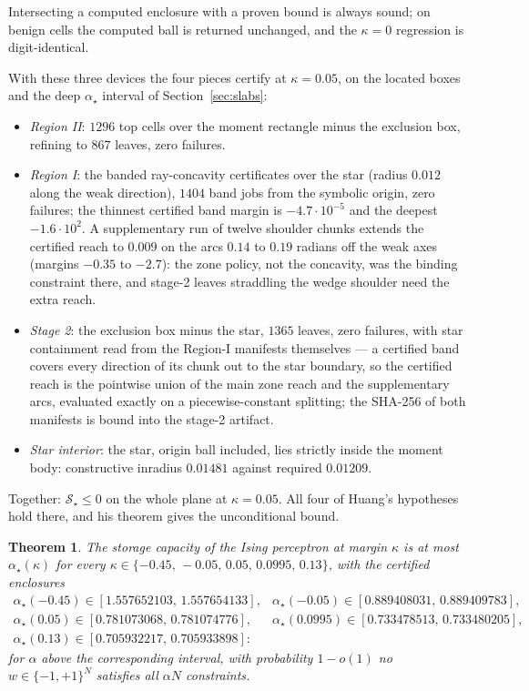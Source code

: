 \documentclass[11pt]{article}
\newtheorem{theorem}{Theorem}
\theoremstyle{remark}
\newcommand{\sS}{\mathcal{S}}
\begin{document}
Intersecting a computed
enclosure with a proven bound is always sound; on benign cells the
computed ball is returned unchanged, and the $\kappa=0$ regression is
digit-identical.

With these three devices the four pieces certify at $\kappa=0.05$, on
the located boxes and the deep $\alpha_\star$ interval of
Section~\ref{sec:slabs}:

\begin{itemize}
\item[(i)] \emph{Region II}: $1296$ top cells over the moment
rectangle minus the exclusion box, refining to $867$ leaves, zero
failures.
\item[(ii)] \emph{Region I}: the banded ray-concavity certificates
over the star (radius $0.012$ along the weak direction), $1404$
band jobs from the symbolic origin, zero failures; the thinnest
certified band margin is $-4.7\cdot10^{-5}$ and the deepest
$-1.6\cdot10^{2}$.  A supplementary run of twelve shoulder chunks
extends the certified reach to $0.009$ on the arcs $0.14$ to $0.19$
radians off the weak axes (margins $-0.35$ to $-2.7$): the zone
policy, not the concavity, was the binding constraint there, and
stage-2 leaves straddling the wedge shoulder need the extra reach.
\item[(iii)] \emph{Stage 2}: the exclusion box minus the star,
$1365$ leaves, zero failures, with star containment read from the
Region-I manifests themselves --- a certified band covers every
direction of its chunk out to the star boundary, so the certified
reach is the pointwise union of the main zone reach and the
supplementary arcs, evaluated exactly on a piecewise-constant
splitting; the SHA-256 of both manifests is bound into the stage-2
artifact.
\item[(iv)] \emph{Star interior}: the star, origin ball included,
lies strictly inside the moment body: constructive inradius
$0.01481$ against required $0.01209$.
\end{itemize}

Together: $\sS_\star\le0$ on the whole plane at $\kappa=0.05$.  All
four of Huang's hypotheses hold there, and his theorem gives the
unconditional bound.

\begin{theorem}\label{thm:main}
The storage capacity of the Ising perceptron at margin $\kappa$ is at
most $\alpha_\star(\kappa)$ for every
$\kappa\in\{-0.45,\,-0.05,\,0.05,\,0.0995,\,0.13\}$, with the
certified enclosures
\[
\begin{array}{ll}
\alpha_\star(-0.45)\in[1.557652103,\,1.557654133], &
\alpha_\star(-0.05)\in[0.889408031,\,0.889409783],\\
\alpha_\star(0.05)\in[0.781073068,\,0.781074776], &
\alpha_\star(0.0995)\in[0.733478513,\,0.733480205],\\
\alpha_\star(0.13)\in[0.705932217,\,0.705933898]: &
\end{array}
\]
for $\alpha$ above the corresponding interval, with probability
$1-o(1)$ no $w\in\{-1,+1\}^N$ satisfies all $\alpha N$ constraints.
\end{theorem}
\end{document}

